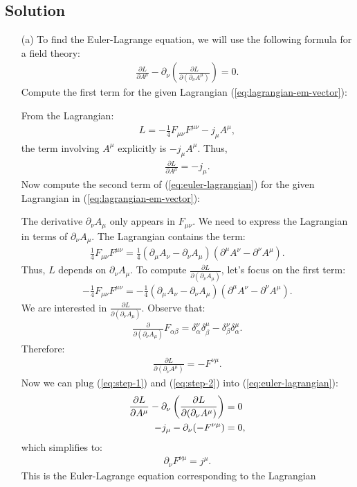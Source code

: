 \subsection*{Solution}
\begin{itemize}
\item [(a)] To find the Euler-Lagrange equation, we will use the following formula for a field theory:
\begin{align}
    \frac{\partial L}{\partial A^\mu} - \partial_\nu \left( \frac{\partial L}{\partial (\partial_\nu A^\mu)} \right) = 0.\label{eq:euler-lagrangian}
\end{align}
Compute the first term for the given Lagrangian (\ref{eq:lagrangian-em-vector}):

From the Lagrangian:
\begin{align*}
    L = -\frac{1}{4} F_{\mu\nu} F^{\mu\nu} - j_\mu A^\mu,
\end{align*}
the term involving $A^\mu$ explicitly is $-j_\mu A^\mu$. Thus,
\begin{align}
    \frac{\partial L}{\partial A^\mu} = -j_\mu.\label{eq:step-1}
\end{align}
Now compute the second term of (\ref{eq:euler-lagrangian}) for the given Lagrangian in (\ref{eq:lagrangian-em-vector}):

The derivative $\partial_\nu A_\mu$ only appears in $F_{\mu\nu}$. We need to express the Lagrangian in terms of $\partial_\nu A_\mu$. The Lagrangian contains the term:
\begin{align*}
    \frac{1}{4}F_{\mu\nu} F^{\mu\nu} = \frac{1}{4}(\partial_\mu A_\nu - \partial_\nu A_\mu)(\partial^\mu A^\nu - \partial^\nu A^\mu).
\end{align*}
Thus, $L$ depends on $\partial_\nu A_\mu$. To compute $\displaystyle\frac{\partial L}{\partial (\partial_\nu A_\mu)}$, let's focus on the first term:
\begin{align}
    -\frac{1}{4} F_{\mu\nu} F^{\mu\nu}= -\frac{1}{4} (\partial_\mu A_\nu - \partial_\nu A_\mu)(\partial^\mu A^\nu - \partial^\nu A^\mu).
\end{align}
We are interested in $\displaystyle\frac{\partial L}{\partial (\partial_\nu A_\mu)}$. Observe that:
\begin{align}
    \frac{\partial}{\partial (\partial_\nu A_\mu)} F_{\alpha\beta} = \delta^\nu_\alpha \delta^\mu_\beta - \delta^\nu_\beta \delta^\mu_\alpha.\label{eq:step-2}
\end{align}
Therefore:
\begin{align}
    \frac{\partial L}{\partial (\partial_\nu A^\mu)} = - F^{\nu\mu}.
\end{align}
Now we can plug (\ref{eq:step-1}) and (\ref{eq:step-2}) into (\ref{eq:euler-lagrangian}):
\begin{align}
    \frac{\partial L}{\partial A^\mu} - \partial_\nu \left( \frac{\partial L}{\partial (\partial_\nu A^\mu)} \right) &= 0\notag\\
    -j_\mu - \partial_\nu (-F^{\nu\mu}) &= 0,
\end{align}
which simplifies to:
\begin{align}
    \partial_\nu F^{\nu\mu} = j^\mu.
\end{align}
This is the Euler-Lagrange equation corresponding to the Lagrangian


\end{itemize}
